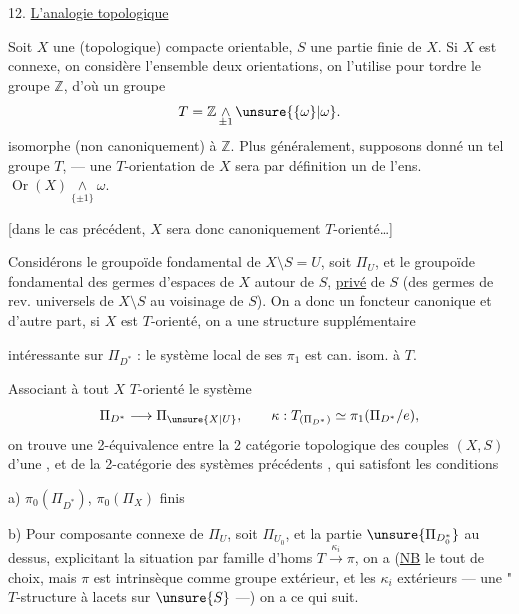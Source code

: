
12. \uline{L'analogie topologique}

Soit \(X\) une  (topologique) compacte
orientable, \(S\) une partie finie de \(X\). Si \(X\) est connexe, on considère
l'ensemble \inserted{\unsure{\(\omega\)}}  deux orientations,
on l'utilise pour tordre le groupe \(\mathbb Z\), d'où un groupe 
\[
T=\mathbb Z\mathop{\wedge}\limits_{\pm1}\unsure{\{\omega\}|\omega}.
\]
isomorphe (non canoniquement) à \(\mathbb Z\). Plus généralement, supposons
donné un tel groupe \(T\),
--- une \(T\)-orientation de \(X\) sera par définition un 
de l'ens. \(\operatorname{Or}(X)\mathop{\wedge}\limits_{\{\pm1\}}\omega\).

[dans le cas précédent, \(X\) sera donc canoniquement \(T\)-orienté\ldots]

Considérons le groupoïde fondamental de \(X\setminus S=U\), soit \(\Pi_U\),
et le groupoïde fondamental  des germes
d'espaces de \(X\) autour de \(S\), \uline{privé} de \(S\)
(des germes de rev. universels de \(X\setminus S\) au voisinage de \(S\)).
On a donc un foncteur canonique
et d'autre part,  si \(X\) est \(T\)-orienté, on a une
structure supplémentaire



intéressante sur  \(\Pi_{D^*}\) : le système local de
ses \(\pi_1\) est can. isom. à \(T\).

Associant à tout \(X\) \(T\)-orienté le système
\[
\Pi_{D^*}\longrightarrow\Pi_{\unsure{X|U}},\qquad
\kappa:T_{(\Pi_{D^*})}\simeq\pi_1(\Pi_{D^*}/e),
\]
on trouve une 2-équivalence entre la 2 catégorie topologique des
 couples \((X,S)\) d'une
, et de la 2-catégorie des systèmes
précédents , \unsure{(}qui satisfont les conditions

a) \(\pi_0(\Pi_{D^*})\),  \(\pi_0(\Pi_X)\) finis

b) Pour  composante connexe de \(\Pi_U\), soit
\(\Pi_{U_0}\), et la partie \(\unsure{\Pi_{D_0^*}}\) au dessus, explicitant la
situation  par 
 famille d'homs
\(T\xrightarrow{\kappa_i}\pi\), on a (\uline{NB} le tout  de choix,
mais \(\pi\) est intrinsèque comme groupe extérieur, et les \(\kappa_i\)
 extérieurs ---  une "\(T\)-structure à lacets
sur \(\unsure{S}\) ---) on a ce qui suit.

